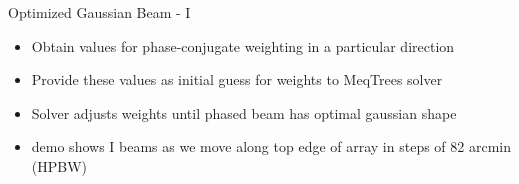 \documentclass[pdf,azure,slideColor,colorBG]{prosper}
\begin{document}
\begin{slide}{Optimized Gaussian Beam - I}
\begin{small}
\begin{itemize}
\item Obtain values for phase-conjugate weighting in a particular direction
\item Provide these values as initial guess for weights to MeqTrees solver
\item Solver adjusts weights until phased beam has optimal gaussian shape
\item demo shows I beams as we move along top edge of array in steps of 82 arcmin (HPBW)
\end{itemize}
\end {small}
{\centering
{}
}
\end{slide}
\end{document}

